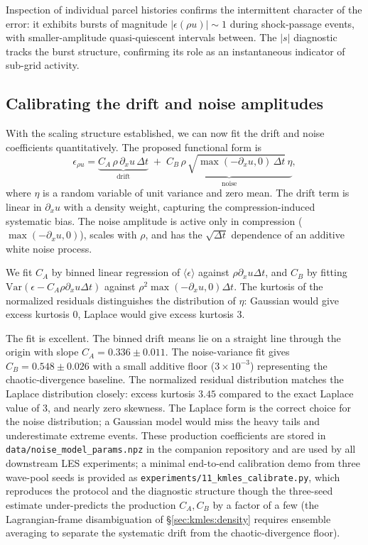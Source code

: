 \documentclass[11pt,letterpaper]{article}
\begin{document}
Inspection of individual parcel histories confirms the intermittent character of the error: it exhibits bursts of magnitude $|\epsilon(\rho u)| \sim 1$ during shock-passage events, with smaller-amplitude quasi-quiescent intervals between. The $|s|$ diagnostic tracks the burst structure, confirming its role as an instantaneous indicator of sub-grid activity.

\subsection{Calibrating the drift and noise amplitudes}
\label{sec:kmles:calibration}

With the scaling structure established, we can now fit the drift and noise coefficients quantitatively. The proposed functional form is
\begin{equation}
\epsilon_{\rho u} = \underbrace{C_A \, \rho \, \partial_x u \, \Delta t}_{\text{drift}} \;+\; \underbrace{C_B \, \rho \, \sqrt{\max(-\partial_x u, 0)\,\Delta t}\, \eta}_{\text{noise}},
\label{eq:km_model}
\end{equation}
where $\eta$ is a random variable of unit variance and zero mean. The drift term is linear in $\partial_x u$ with a density weight, capturing the compression-induced systematic bias. The noise amplitude is active only in compression ($\max(-\partial_x u, 0)$), scales with $\rho$, and has the $\sqrt{\Delta t}$ dependence of an additive white noise process.

We fit $C_A$ by binned linear regression of $\langle \epsilon \rangle$ against $\rho \partial_x u \Delta t$, and $C_B$ by fitting $\mathrm{Var}(\epsilon - C_A \rho \partial_x u \Delta t)$ against $\rho^2 \max(-\partial_x u, 0) \Delta t$. The kurtosis of the normalized residuals distinguishes the distribution of $\eta$: Gaussian would give excess kurtosis 0, Laplace would give excess kurtosis 3.

The fit is excellent. The binned drift means lie on a straight line through the origin with slope $C_A = 0.336 \pm 0.011$. The noise-variance fit gives $C_B = 0.548 \pm 0.026$ with a small additive floor ($3 \times 10^{-3}$) representing the chaotic-divergence baseline. The normalized residual distribution matches the Laplace distribution closely: excess kurtosis $3.45$ compared to the exact Laplace value of $3$, and nearly zero skewness. The Laplace form is the correct choice for the noise distribution; a Gaussian model would miss the heavy tails and underestimate extreme events. These production coefficients are stored in \texttt{data/noise\_model\_params.npz} in the companion repository and are used by all downstream LES experiments; a minimal end-to-end calibration demo from three wave-pool seeds is provided as \texttt{experiments/11\_kmles\_calibrate.py}, which reproduces the protocol and the diagnostic structure though the three-seed estimate under-predicts the production $C_A, C_B$ by a factor of a few (the Lagrangian-frame disambiguation of \S\ref{sec:kmles:density} requires ensemble averaging to separate the systematic drift from the chaotic-divergence floor).
\end{document}
